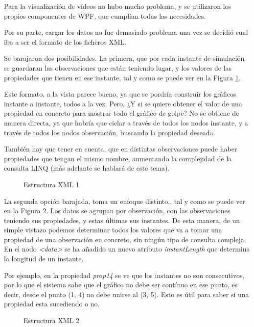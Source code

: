 Para la visualizaci\'on de v\'ideos no hubo mucho problema, y se utilizaron los
propios componentes de WPF, que cumpl\'ian todas las necesidades.

Por su parte, cargar los datos no fue demasiado problema una vez se decidi\'o cual iba a ser el formato de los
ficheros XML.

Se barajaron dos posibilidades. La primera, que por cada instante de simulaci\'on se guardaran las observaciones
que est\'an teniendo lugar, y los valores de las propiedades que tienen en ese instante, tal y como
se puede ver en la Figura \ref{Estructura XML1}.

Este formato, a la vista parece bueno, ya que se pordr\'ia construir los gr\'aficos instante a instante,
todos a la vez. Pero, ¿Y si se quiere obtener el valor de una propiedad en concreto para mostrar todo 
el gr\'afico de golpe? No se obtiene de manera directa, ya que habr\'ia que ciclar a trav\'es de todos los nodos
instante, y a trav\'es de todos los nodos observaci\'on, buscando la propiedad deseada.

Tambi\'en hay que tener en cuenta, que en distintas observaciones puede haber propiedades que tengan el mismo nombre, 
aumentando la complejidad de la consulta LINQ (m\'as adelante se hablar\'a de este tema).

\begin{figure}[h]
    
    \caption[Estructura XML 1]{Estructura XML 1}
    \label{Estructura XML1}
\end{figure}

La segunda opci\'on barajada, toma un enfoque distinto., tal y como se puede
ver en la Figura \ref{Estructura XML2}. Los datos se agrupan por observaci\'on, con las observaciones teniendo sus propiedades,
y estas \'ultimas sus instantes. De esta manera, de un simple vistazo podemos determinar todos los valores que va a tomar
una propiedad de una observaci\'on en concreto, sin ning\'un tipo de consulta compleja.
En el nodo \emph{<data>} se ha a\~{n}adido un nuevo atributo \emph{instantLength} que 
determina la longitud de un instante. 

Por ejemplo, en la propiedad \emph{prop14} se ve que los instantes no son consecutivos, por lo que el sistema sabe que el 
gr\'{a}fico no debe ser cont\'inuo en ese punto, es decir, desde el punto (1, 4) no debe unirse al 
(3, 5). Esto es \'{u}til para saber si una propiedad esta sucediendo o no.

\begin{figure}[h]
    
    \caption[Estructura XML 2]{Estructura XML 2}
    \label{Estructura XML2}
\end{figure}

